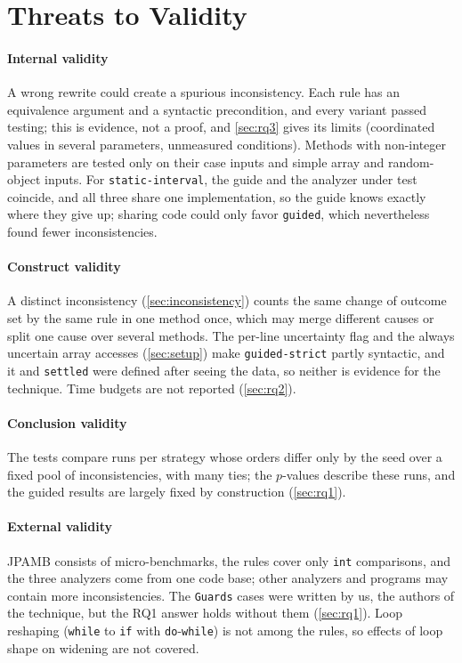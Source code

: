 \section{Threats to Validity}
\label{sec:threats}

\paragraph{Internal validity}
A wrong rewrite could create a spurious inconsistency. Each rule has an
equivalence argument and a syntactic precondition, and every variant passed
testing; this is evidence, not a proof, and \cref{sec:rq3} gives its limits
(coordinated values in several parameters, unmeasured conditions). Methods with
non-integer parameters are tested only on their case inputs and simple array
and random-object inputs. For \texttt{static-interval}, the guide and the
analyzer under test coincide, and all three share one implementation, so the
guide knows exactly where they give up; sharing code could only favor
\texttt{guided}, which nevertheless found fewer inconsistencies.

\paragraph{Construct validity}
A distinct inconsistency (\cref{sec:inconsistency}) counts the same change of
outcome set by the same rule in one method once, which may merge different
causes or split one cause over several methods. The per-line uncertainty
flag and the always uncertain array accesses (\cref{sec:setup}) make
\texttt{guided-strict} partly syntactic, and it and \texttt{settled} were
defined after seeing the data, so neither is evidence for the technique. Time
budgets are not reported (\cref{sec:rq2}).

\paragraph{Conclusion validity}
The tests compare \NumSeeds{} runs per strategy whose orders differ only by
the seed over a fixed pool of \Pool{} inconsistencies, with many ties; the
$p$-values describe these runs, and the guided results are largely fixed by
construction (\cref{sec:rq1}).

\paragraph{External validity}
JPAMB consists of micro-benchmarks, the rules cover only \texttt{int}
comparisons, and the three analyzers come from one code base; other analyzers
and programs may contain more inconsistencies. The \texttt{Guards} cases were
written by us, the authors of the technique, but the RQ1 answer holds without
them (\cref{sec:rq1}). Loop
reshaping (\texttt{while} to \texttt{if} with \texttt{do}-\texttt{while}) is
not among the rules, so effects of loop shape on widening are not covered.
